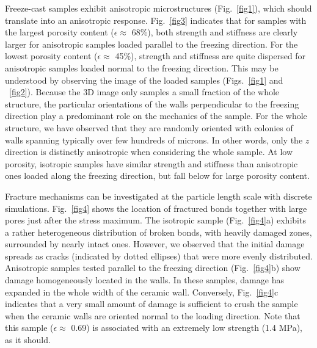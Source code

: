 \documentclass[preprint,12pt,3p]{elsarticle}
\begin{document}
Freeze-cast samples exhibit anisotropic microstructures (Fig.~\ref{fig1}), which should translate into an anisotropic response. Fig.~\ref{fig3} indicates that for samples with the largest porosity content ($\epsilon \approx$ 68\%), both strength and stiffness are clearly larger for anisotropic samples loaded parallel to the freezing direction. For the lowest porosity content ($\epsilon\approx$ 45\%), strength and stiffness are quite dispersed for anisotropic samples loaded normal to the freezing direction. This may be understood by observing the image of the loaded samples (Figs.~\ref{fig1} and ~\ref{fig2}). Because the 3D image only samples a small fraction of the whole structure, the particular orientations of the walls perpendicular to the freezing direction play a predominant role on the mechanics of the sample. For the whole structure, we have observed that they are randomly oriented with colonies of walls spanning typically over few hundreds of microns. In other words, only the $z$ direction is distinctly anisotropic when considering the whole sample. At low porosity, isotropic samples have similar strength and stiffness than anisotropic ones loaded along the freezing direction, but fall below for large porosity content. 


Fracture mechanisms can be investigated at the particle length scale with discrete simulations. Fig.~\ref{fig4} shows the location of fractured bonds together with large pores just after the stress maximum. The isotropic sample (Fig.~\ref{fig4}a) exhibits a rather heterogeneous distribution of broken bonds, with heavily damaged zones, surrounded by nearly intact ones. However, we observed that the initial damage spreads as cracks (indicated by dotted ellipses) that were more evenly distributed. Anisotropic samples tested parallel to the freezing direction (Fig.~\ref{fig4}b) show damage homogeneously located in the walls. In these samples, damage has expanded in the whole width of the ceramic wall. Conversely, Fig.~\ref{fig4}c indicates that a very small amount of damage is sufficient to crush the sample when the ceramic walls are oriented normal to the loading direction. Note that this sample ($\epsilon\approx$ 0.69) is associated with an extremely low strength (1.4 MPa), as it should.
\end{document}

